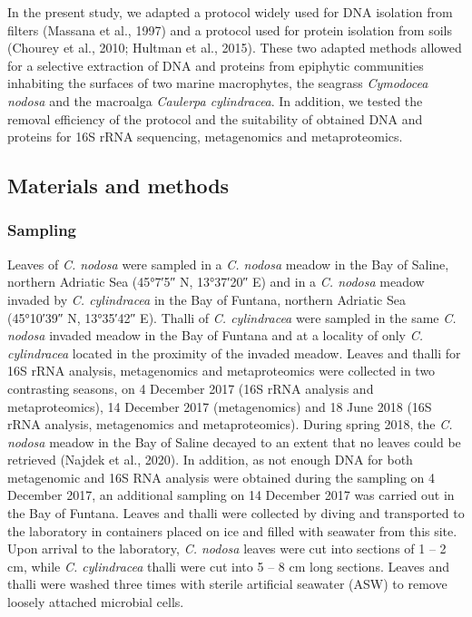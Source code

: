 \documentclass[12pt,]{article}
\begin{document}
In the present study, we adapted a protocol widely used for DNA
isolation from filters (Massana et al., 1997) and a protocol used for
protein isolation from soils (Chourey et al., 2010; Hultman et al.,
2015). These two adapted methods allowed for a selective extraction of
DNA and proteins from epiphytic communities inhabiting the surfaces of
two marine macrophytes, the seagrass \emph{Cymodocea nodosa} and the
macroalga \emph{Caulerpa cylindracea}. In addition, we tested the
removal efficiency of the protocol and the suitability of obtained DNA
and proteins for 16S rRNA sequencing, metagenomics and metaproteomics.

\newpage

\hypertarget{materials-and-methods}{%
\subsection{Materials and methods}\label{materials-and-methods}}

\hypertarget{sampling}{%
\subsubsection{Sampling}\label{sampling}}

Leaves of \emph{C. nodosa} were sampled in a \emph{C. nodosa} meadow in
the Bay of Saline, northern Adriatic Sea (\ang{45;7;5} N, \ang{13;37;20}
E) and in a \emph{C. nodosa} meadow invaded by \emph{C. cylindracea} in
the Bay of Funtana, northern Adriatic Sea (\ang{45;10;39} N,
\ang{13;35;42} E). Thalli of \emph{C. cylindracea} were sampled in the
same \emph{C. nodosa} invaded meadow in the Bay of Funtana and at a
locality of only \emph{C. cylindracea} located in the proximity of the
invaded meadow. Leaves and thalli for 16S rRNA analysis, metagenomics
and metaproteomics were collected in two contrasting seasons, on 4
December 2017 (16S rRNA analysis and metaproteomics), 14 December 2017
(metagenomics) and 18 June 2018 (16S rRNA analysis, metagenomics and
metaproteomics). During spring 2018, the \emph{C. nodosa} meadow in the
Bay of Saline decayed to an extent that no leaves could be retrieved
(Najdek et al., 2020). In addition, as not enough DNA for both
metagenomic and 16S RNA analysis were obtained during the sampling on 4
December 2017, an additional sampling on 14 December 2017 was carried
out in the Bay of Funtana. Leaves and thalli were collected by diving
and transported to the laboratory in containers placed on ice and filled
with seawater from this site. Upon arrival to the laboratory, \emph{C.
nodosa} leaves were cut into sections of 1 -- 2 \si{\cm}, while \emph{C.
cylindracea} thalli were cut into 5 -- 8 \si{\cm} long sections. Leaves
and thalli were washed three times with sterile artificial seawater
(ASW) to remove loosely attached microbial cells.
\end{document}
